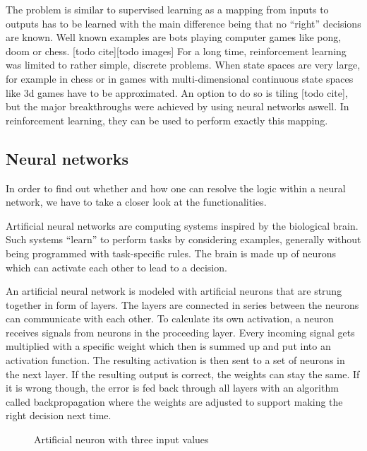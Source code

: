 The problem is similar to supervised learning as a mapping from inputs to outputs has to be learned with the main difference being that no ``right'' decisions are known.
Well known examples are bots playing computer games like pong, doom or chess. [todo cite][todo images] For a long time, reinforcement learning was limited to rather simple, discrete problems. When state spaces are very large, for example in chess or in games with multi-dimensional continuous state spaces like 3d games have to be approximated. An option to do so is tiling [todo cite], but the major breakthroughs were achieved by using neural networks aswell. In reinforcement learning, they can be used to perform exactly this mapping.

\subsection{Neural networks}

\cite{Rosenblatt58theperceptron:} 
In order to find out whether and how one can resolve the logic within a neural network, we have to take a closer look at the functionalities.

Artificial neural networks are computing systems inspired by the biological brain. Such systems ``learn'' to perform tasks by considering examples, generally without being programmed with task-specific rules. The brain is made up of neurons which can activate each other to lead to a decision.

An artificial neural network is modeled with artificial neurons that are strung together in form of layers. The layers are connected in series between the neurons can communicate with each other. To calculate its own activation, a neuron receives signals from neurons in the proceeding layer. Every incoming signal gets multiplied with a specific weight which then is summed up and put into an activation function. The resulting activation is then sent to a set of neurons in the next layer. If the resulting output is correct, the weights can stay the same. If it is wrong though, the error is fed back through all layers with an algorithm called backpropagation where the weights are adjusted to support making the right decision next time.



\begin{figure}
    \centering
    
    \caption{Artificial neuron with three input values}
    \label{tikz artificial neuron}
\end{figure}

